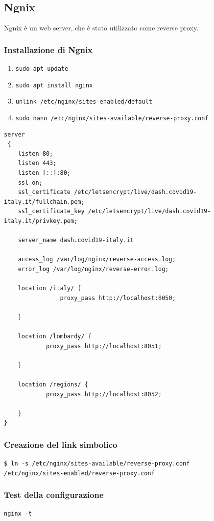 \subsection{Ngnix}
Ngnix è un web server, che è stato utilizzato come reverse proxy.
\subsubsection*{Installazione di Ngnix}

\begin{enumerate}
    \item \texttt{sudo apt update}
    \item \texttt{sudo apt install nginx}
    \item \texttt{unlink /etc/nginx/sites-enabled/default}
    \item \texttt{sudo nano /etc/nginx/sites-available/reverse-proxy.conf}
\end{enumerate}

\begin{lstlisting}[basicstyle=\ttfamily\small]
server
 {
    listen 80;
    listen 443;
    listen [::]:80;
    ssl on;
    ssl_certificate /etc/letsencrypt/live/dash.covid19-italy.it/fullchain.pem;
    ssl_certificate_key /etc/letsencrypt/live/dash.covid19-italy.it/privkey.pem;

    server_name dash.covid19-italy.it
    
    access_log /var/log/nginx/reverse-access.log;
    error_log /var/log/nginx/reverse-error.log;
    
    location /italy/ {
                proxy_pass http://localhost:8050;

    }

    location /lombardy/ {
            proxy_pass http://localhost:8051;

    }

    location /regions/ {
            proxy_pass http://localhost:8052;

    }
}
\end{lstlisting}

\subsubsection*{Creazione del link simbolico}
\texttt{\$ ln -s /etc/nginx/sites-available/reverse-proxy.conf\\ /etc/nginx/sites-enabled/reverse-proxy.conf}

\subsubsection*{Test della configurazione}
\texttt{nginx -t}

